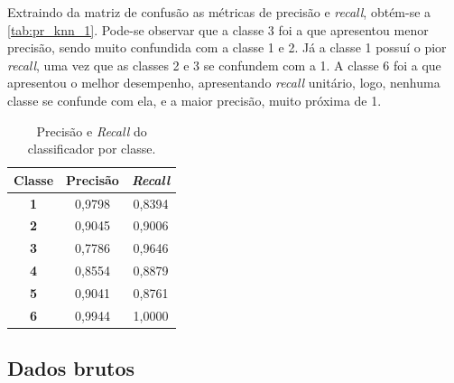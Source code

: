 Extraindo da matriz de confusão as métricas de precisão e \textit{recall}, obtém-se a \autoref{tab:pr_knn_1}. Pode-se observar que a classe 3 foi a que apresentou menor precisão, sendo muito confundida com a classe 1 e 2. Já a classe 1 possuí o pior \textit{recall}, uma vez que as classes 2 e 3 se confundem com a 1. A classe 6 foi a que apresentou o melhor desempenho, apresentando \textit{recall} unitário, logo, nenhuma classe se confunde com ela, e a maior precisão, muito próxima de 1.


\begin{table}[H]
	\centering
	\begin{tabular}{c|c|c}
		\textbf{Classe} & \textbf{Precisão} & \textbf{\textit{Recall}} \\ \hline
		\textbf{1}      & 0,9798            & 0,8394          \\
		\textbf{2}      & 0,9045            & 0,9006          \\
		\textbf{3}      & 0,7786            & 0,9646          \\
		\textbf{4}      & 0,8554            & 0,8879          \\
		\textbf{5}      & 0,9041            & 0,8761          \\
		\textbf{6}      & 0,9944            & 1,0000         
	\end{tabular}
	\caption{Precisão e \textit{Recall} do classificador por classe.}
	\label{tab:pr_knn_1}
\end{table}


\subsection{Dados brutos}





